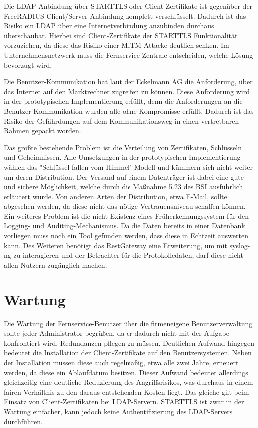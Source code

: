 \documentclass[11pt,a4paper]{report}
\begin{document}
Die LDAP-Anbindung über STARTTLS oder Client-Zertifikate ist gegenüber der FreeRADIUS-Client/Server Anbindung komplett verschlüsselt. Dadurch ist das Risiko ein LDAP über eine Internetverbindung anzubinden durchaus überschaubar. Hierbei sind Client-Zertifikate der STARTTLS Funktionalität vorzuziehen, da diese das Risiko einer MITM-Attacke deutlich senken. Im Unternehmensnetzwerk muss die Fernservice-Zentrale entscheiden, welche Lösung bevorzugt wird.

Die Benutzer-Kommunikation hat laut der Eckelmann AG die Anforderung, über das Internet auf den Marktrechner zugreifen zu können. Diese Anforderung wird in der prototypischen Implementierung erfüllt, denn die Anforderungen an die Benutzer-Kommunikation wurden alle ohne Kompromisse erfüllt. Dadurch ist das Risiko der Gefährdungen auf dem Kommunikationsweg in einen vertretbaren Rahmen gepackt worden. 

Das größte bestehende Problem ist die Verteilung von Zertifikaten, Schlüsseln und Geheimnissen. Alle Umsetzungen in der prototypischen Implementierung wählen das "Schlüssel fallen vom Himmel"-Modell und kümmern sich nicht weiter um deren Distribution. Der Versand auf einem Datenträger ist dabei eine gute und sichere Möglichkeit, welche durch die Maßnahme 5.23 des BSI ausführlich erläutert wurde. Von anderen Arten der Distribution, etwa E-Mail, sollte abgesehen werden, da diese nicht das nötige Vertrauensniveau schaffen können. Ein weiteres Problem ist die nicht Existenz eines Früherkennungssystem für den Logging- und Auditing-Mechanismus. Da die Daten bereits in einer Datenbank vorliegen muss noch ein Tool gefunden werden, dass diese in Echtzeit auswerten kann. Des Weiteren benötigt das RestGateway eine Erweiterung, um mit syslog-ng zu interagieren und der Betrachter für die Protokolledaten, darf diese nicht allen Nutzern zugänglich machen.

\section{Wartung}

Die Wartung der Fernservice-Benutzer über die firmeneigene Benutzerverwaltung sollte jeder Administrator begrüßen, da er dadurch nicht mit der Aufgabe konfrontiert wird, Redundanzen pflegen zu müssen. Deutlichen Aufwand hingegen bedeutet die Installation der Client-Zertifikate auf den Benutzersystemen. Neben der Installation müssen diese auch regelmäßig, etwa alle zwei Jahre, erneuert werden, da diese ein Ablaufdatum besitzen. Dieser Aufwand bedeutet allerdings gleichzeitig eine deutliche Reduzierung des Angriffsrisikos, was durchaus in einem fairen Verhältnis zu den daraus entstehenden Kosten liegt. Das gleiche gilt beim Einsatz von Client-Zertifikaten bei LDAP-Servern. STARTTLS ist zwar in der Wartung einfacher, kann jedoch keine Authentifizierung des LDAP-Servers durchführen. 
\end{document}

